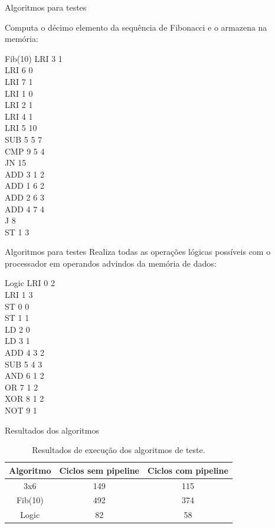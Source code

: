 \documentclass{beamer}
\begin{document}
	\begin{frame}{Algoritmos para testes}

		Computa o décimo elemento da sequência de Fibonacci e o armazena na memória:\\
		\begin{block}{Fib(10)}
		{\scriptsize
		LRI 3 1\\    
		LRI 6 0\\ 
		LRI 7 1\\   
		LRI 1 0\\   
		LRI 2 1\\  
		LRI 4 1\\   
		LRI 5 10\\  
		SUB 5 5 7\\ 
		CMP 9 5 4\\ 
		JN 15\\	  
		ADD 3 1 2\\ 
		ADD 1 6 2\\ 
		ADD 2 6 3\\ 
		ADD 4 7 4\\ 
		J 8\\	
		ST 1 3\\
		}
		\end{block}
	\end{frame}

	\begin{frame}{Algoritmos para testes}
			Realiza todas as operações lógicas possíveis com o processador
				em operandos advindos da memória de dados:\\
		\begin{block}{Logic}
		{\footnotesize
		LRI 0 2\\
		LRI 1 3\\
		ST 0 0\\
		ST 1 1\\
		LD 2 0\\
		LD 3 1\\
		ADD 4 3 2\\
		SUB 5 4 3\\
		AND 6 1 2\\
		OR 7 1 2\\
		XOR 8 1 2\\
		NOT 9 1\\
		}
		\end{block}

	\end{frame}

	\begin{frame}{Resultados dos algoritmos}
		\begin{table}[H]
			\centering
			\begin{tabular}{c | c | c}

			Algoritmo	& Ciclos sem pipeline	& Ciclos com pipeline\\
			\hline
			3x6		& 149			& 115		     \\
			Fib(10)		& 492			& 374		     \\
			Logic	        & 82			& 58		     \\
			\hline
			\end{tabular}
			\caption{Resultados de execução dos algoritmos de teste.}
			\label{tab:resultados}
		\end{table}
	\end{frame}
\end{document}
